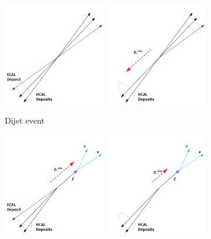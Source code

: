 \begin{figure}[]
    \begin{center}
        \begin{subfigure}[t]{0.49\textwidth}
            \includegraphics[width=0.49\textwidth]{figures/vbf/triggers/normal_dijet.pdf}
            \includegraphics[width=0.49\textwidth]{figures/vbf/triggers/prefire_dijet.pdf}
            \caption{Dijet event}
        \end{subfigure}
        \begin{subfigure}[t]{0.49\textwidth}
            \includegraphics[width=0.49\textwidth]{figures/vbf/triggers/normal_z.pdf}
            \includegraphics[width=0.49\textwidth]{figures/vbf/triggers/prefire_z.pdf}

\end{subfigure}
\end{center}
\end{figure}
